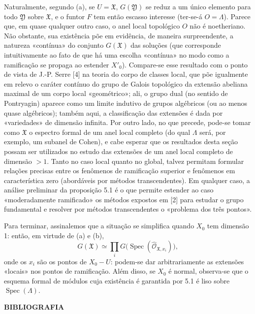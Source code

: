 \documentclass[11pt,twoside,openany]{book}
\numberwithin{equation}{section}
\newcommand{\src}[1]{%
  \phantomsection\hypertarget{src:#1}{}%
  \marginpar{\raggedleft\footnotesize\sffamily #1}%
}
\theoremstyle{plain}
\theoremstyle{definition}
\theoremstyle{remark}
\newcommand{\FgaUnitKey}{frontmatter}
\renewcommand{\src}[1]{%
  \phantomsection\hypertarget{src:\FgaUnitKey:#1}{}%
  \marginpar{\raggedleft\footnotesize\sffamily #1}%
}
\begin{document}
Naturalmente, segundo (a), se $U=\mathfrak X$, $G(\mathfrak Y)$ se reduz a um
único elemento para todo $\mathfrak Y$ sobre $\mathfrak X$, e o funtor $F$
tem então escasso interesse (ter-se-á $O=\Lambda$). Parece que, em quase
qualquer outro caso, o anel local topológico $O$ não é noetheriano. Não
obstante, sua existência põe em evidência, de maneira surpreendente, a
natureza «contínua» do conjunto $G(\mathfrak X)$ das soluções (que
corresponde intuitivamente ao fato de que há uma escolha «contínua» no
modo como a ramificação se propaga ao estender $X'_0$). Compare-se esse
resultado com o ponto de vista de J.-P. Serre [4] na teoria do corpo de
classes local, que põe igualmente em relevo o caráter contínuo do grupo de
Galois topológico da extensão abeliana maximal de um corpo local
«geométrico»; ali, o grupo dual (no sentido de Pontryagin) aparece como um
limite indutivo de grupos algébricos (ou ao menos quase algébricos); também
aqui, a classificação das extensões é dada por «variedades» de
dimensão infinita. Por outro lado, no que precede, pode-se tomar como
$\mathfrak X$ o espectro formal de um anel local completo (do qual
$\Lambda$ será, por exemplo, um subanel de Cohen), e cabe esperar que os
resultados desta seção possam ser utilizados no estudo das extensões
de um anel local completo de dimensão $>1$. Tanto no caso local quanto no
global, talvez permitam formular relações precisas entre os fenômenos de
ramificação superior e fenômenos em característica zero (abordáveis por
métodos transcendentes). Em qualquer caso, a análise preliminar da
proposição 5.1 é o que permite estender ao caso «moderadamente ramificado»
os métodos expostos em [2] para estudar o grupo fundamental e resolver por
métodos transcendentes o «problema dos três pontos».

Para terminar, assinalemos que a situação se simplifica quando $X_0$ tem dimensão 1: então, em virtude de (a) e (b),
\[
  G(\mathfrak X)\simeq
  \prod_iG\bigl(\operatorname{Spec}(\widehat{\mathcal O}_{\mathfrak X,x_i})\bigr),
\]
onde os $x_i$ são os pontos de $X_0-U$: podem-se dar arbitrariamente as
extensões «locais» nos pontos de ramificação. Além disso, se $X_0$ é normal,
observa-se que o esquema formal de módulos cuja existência é garantida por 5.1 é
liso sobre $\operatorname{Spec}(\Lambda)$.

\src{390}
\begin{center}
  \textbf{BIBLIOGRAFIA}
\end{center}
\end{document}
